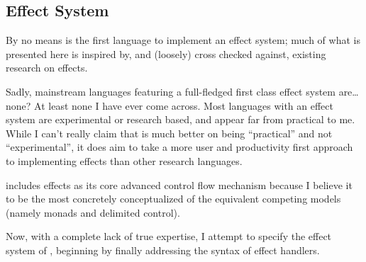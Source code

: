 \subsection{Effect System}
\label{sec:effects}

By no means is \Trilogy{} the first language to implement an effect system;
much of what is presented here is inspired by, and (loosely) cross checked against,
existing research on effects\cite{eff}.

Sadly, mainstream languages featuring a full-fledged first class effect system
are\dots{} none? At least none I have ever come across. Most languages with an
effect system are experimental or research based, and appear far from practical
to me. While I can't really claim that \Trilogy{} is much better on being ``practical''
and not ``experimental'', it does aim to take a more user and productivity first
approach to implementing effects than other research languages.

\Trilogy{} includes effects as its core advanced control flow mechanism because
I believe it to be the most concretely conceptualized of the equivalent competing
models (namely monads and delimited control\cite{effmondel}).

Now, with a complete lack of true expertise, I attempt to specify the effect
system of \Trilogy{}, beginning by finally addressing the syntax of effect
handlers.

\begin{bnf*}
     \\
     \\
     \\
     \\
     \\
     \\
\end{bnf*}

